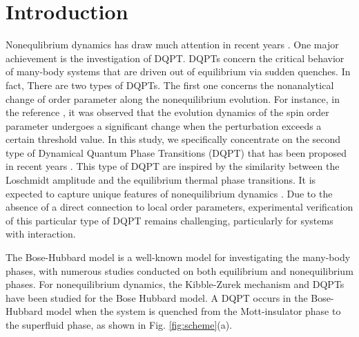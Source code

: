 \documentclass[%
reprint,
superscriptaddress,
amsmath,amssymb,
aps,
pra,
floatfix,
]{revtex4-1}
\begin{document}
\section{Introduction}

Nonequlibrium dynamics has draw much attention in recent years \cite{mitra2018,langen2016,dziarmaga2010,will2010,wilczek2012,goldman2014,eisert2015,poon2016}. One major achievement is the investigation of DQPT. DQPTs concern the critical behavior of many-body systems that are driven out of equilibrium via sudden quenches. In fact, There are two types of DQPTs. The first one concerns the nonanalytical change of order parameter along the nonequilibrium evolution\cite{poon2016,zhang2017}. For instance, in the reference \cite{poon2016}, it was observed that the evolution dynamics of the spin order parameter undergoes a significant change when the perturbation exceeds a certain threshold value. In this study, we specifically concentrate on the second type of Dynamical Quantum Phase Transitions (DQPT) that has been proposed in recent years \cite{heyl2013, heyl2018}.  This type of DQPT are inspired by the similarity between the Loschmidt amplitude  and the equilibrium thermal phase transitions. It is expected to capture unique features of nonequilibrium dynamics \cite{bhattacharya2017,sharma2016,heyl2017,budich2016,karrasch2017,wang2019,heyl2015,de2021}. Due to the absence of a direct connection to local order parameters, experimental verification of this particular type of DQPT remains challenging, particularly for systems with interaction.

The Bose-Hubbard model is a well-known model for investigating the many-body phases, with numerous studies conducted on both equilibrium and nonequilibrium phases. For nonequilibrium dynamics, the Kibble-Zurek mechanism \cite{huang2021,braun2015,zheng2023} and DQPTs \cite{lacki2019} have been studied for the Bose Hubbard model. A DQPT occurs in the Bose-Hubbard model when the system is quenched from the Mott-insulator phase to the superfluid phase, as shown in Fig. \ref{fig:scheme}(a).
\end{document}
